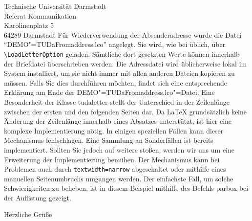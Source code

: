 \documentclass[
	german, %
	accentcolor=9c,%
	premium=true,%
]{tudaletter}
\begin{document}
\begin{letter}{%
    Technische Universität Darmstadt\\
    Referat Kommunikation\\
    Karolinenplatz 5\\
    64289 Darmstadt}
Für Wiederverwendung der Absenderadresse wurde die Datei \enquote{DEMO"=TUDaFromaddress.lco} angelegt.
Sie wird, wie bei \KOMAScript{} üblich, über \verb+\LoadLetterOption+ geladen.
Sämtliche dort gesetzten Werte können innerhalb der Briefdatei überschrieben werden.
Die Adressdatei wird üblicherweise lokal im System installiert, um sie nicht immer mit allen anderen Dateien kopieren zu müssen.
Falls Sie dies durchführen möchten, findet sich eine entsprechende Erklärung am Ende der DEMO"=TUDaFromaddress.lco"=Datei.
Eine Besonderheit der Klasse tudaletter stellt der Unterschied in der Zeilenlänge zwischen der ersten und den folgenden Seiten dar.
Da \LaTeX{} grundsätzlich keine Änderung der Zeilenlänge innerhalb eines Absatzes unterstützt, ist hier eine komplexe Implementierung nötig.
In einigen speziellen Fällen kann dieser Mechanismus fehlschlagen.
Eine Sammlung an Sonderfällen ist bereits implementiert.
Sollten Sie jedoch auf weitere stoßen, werden wir uns um eine Erweiterung der Implementierung bemühen.
Der Mechanismus kann bei Problemen auch durch \verb+textwidth=narrow+ abgeschaltet oder mithilfe eines manuellen Seitenumbruchs umgangen werden.
Der einfachste Fall, um solche Schwierigkeiten zu beheben, ist in diesem Beispiel mithilfe des Befehls parbox bei der Auflistung gezeigt.

\closing{Herzliche Grüße}


\end{letter}
\end{document}
